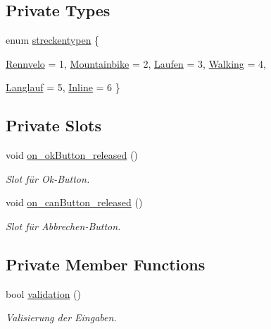\subsection*{Private Types}
\begin{CompactItemize}
\item 
enum \hyperlink{class_neues_rennen_dialog_f7558683e85faf5b234c40264b3eb40c}{streckentypen} \{ \par
\hyperlink{class_neues_rennen_dialog_f7558683e85faf5b234c40264b3eb40c3668056f1fe579d3fe1e4f143d6ac2cf}{Rennvelo} = 1, 
\hyperlink{class_neues_rennen_dialog_f7558683e85faf5b234c40264b3eb40ce6cb3ac2425dcae2491b7d5c002ae3bb}{Mountainbike} = 2, 
\hyperlink{class_neues_rennen_dialog_f7558683e85faf5b234c40264b3eb40c94da6d6668c49c09e8a1e0d89cbc68e2}{Laufen} = 3, 
\hyperlink{class_neues_rennen_dialog_f7558683e85faf5b234c40264b3eb40c0450faecf06e54384061812a6818bdda}{Walking} = 4, 
\par
\hyperlink{class_neues_rennen_dialog_f7558683e85faf5b234c40264b3eb40c36e5719534c311f3c5ac472bfbe086e0}{Langlauf} = 5, 
\hyperlink{class_neues_rennen_dialog_f7558683e85faf5b234c40264b3eb40c0baf4936b820ce1737b2a69f3fd125c4}{Inline} = 6
 \}
\end{CompactItemize}
\subsection*{Private Slots}
\begin{CompactItemize}
\item 
void \hyperlink{class_neues_rennen_dialog_d956cb6fec2452e2d2fc4f21ef1ff63c}{on\_\-okButton\_\-released} ()
\begin{CompactList}\small\item\em Slot für Ok-Button. \item\end{CompactList}\item 
void \hyperlink{class_neues_rennen_dialog_306a748934a817f2ecbe82c52ddbfec1}{on\_\-canButton\_\-released} ()
\begin{CompactList}\small\item\em Slot für Abbrechen-Button. \item\end{CompactList}\end{CompactItemize}
\subsection*{Private Member Functions}
\begin{CompactItemize}
\item 
bool \hyperlink{class_neues_rennen_dialog_2a7c2e07dff84aca530f7d0d048ba99f}{validation} ()
\begin{CompactList}\small\item\em Valisierung der Eingaben. \item\end{CompactList}\end{CompactItemize}
